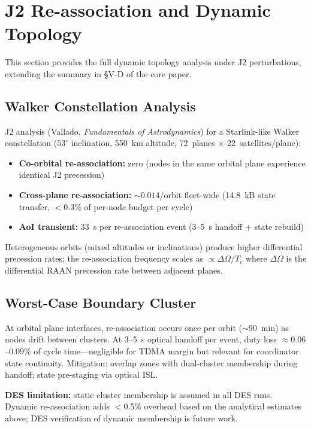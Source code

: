 \documentclass[journal]{IEEEtran}
\begin{document}
\section{J2 Re-association and Dynamic Topology}
\label{sec:supp-j2}

This section provides the full dynamic topology analysis under J2 perturbations, extending the summary in \S V-D of the core paper.

\subsection{Walker Constellation Analysis}

J2 analysis (Vallado, \emph{Fundamentals of Astrodynamics}) for a Starlink-like Walker constellation ($53^\circ$ inclination, 550~km altitude, 72~planes $\times$ 22~satellites/plane):

\begin{itemize}
    \item \textbf{Co-orbital re-association:} zero (nodes in the same orbital plane experience identical J2 precession)
    \item \textbf{Cross-plane re-association:} ${\sim}0.014$/orbit fleet-wide (14.8~kB state transfer, $<$0.3\% of per-node budget per cycle)
    \item \textbf{AoI transient:} 33~s per re-association event (3--5~s handoff + state rebuild)
\end{itemize}

Heterogeneous orbits (mixed altitudes or inclinations) produce higher differential precession rates; the re-association frequency scales as $\propto \Delta\Omega / T_c$ where $\Delta\Omega$ is the differential RAAN precession rate between adjacent planes.

\subsection{Worst-Case Boundary Cluster}

At orbital plane interfaces, re-association occurs once per orbit (${\sim}90$~min) as nodes drift between clusters. At 3--5~s optical handoff per event, duty loss $\approx 0.06$--$0.09\%$ of cycle time---negligible for TDMA margin but relevant for coordinator state continuity. Mitigation: overlap zones with dual-cluster membership during handoff; state pre-staging via optical ISL.

\textbf{DES limitation:} static cluster membership is assumed in all DES runs. Dynamic re-association adds $<$0.5\% overhead based on the analytical estimates above; DES verification of dynamic membership is future work.
\end{document}
